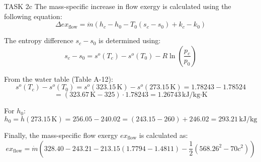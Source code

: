 TASK 2c  
The mass-specific increase in flow exergy is calculated using the following equation:  
\[
\Delta ex_{\text{flow}} = \dot{m} \left( h_c - h_0 - T_0 (s_c - s_0) + k_c - k_0 \right)
\]

The entropy difference \( s_c - s_0 \) is determined using:  
\[
s_c - s_0 = s^o(T_c) - s^o(T_0) - R \ln \left( \frac{p_c}{p_0} \right)
\]

From the water table (Table A-12):  
\[
s^o(T_c) - s^o(T_0) = s^o(323.15 \, \text{K}) - s^o(273.15 \, \text{K}) = 1.78243 - 1.78524
\]  
\[
= (323.67 \, \text{K} - 325) \cdot 1.78243 = 1.26743 \, \text{kJ/kg·K}
\]

For \( h_0 \):  
\[
h_0 = h(273.15 \, \text{K}) = 256.05 - 240.02 = (243.15 - 260) + 246.02 = 293.21 \, \text{kJ/kg}
\]

Finally, the mass-specific flow exergy \( ex_{\text{flow}} \) is calculated as:  
\[
ex_{\text{flow}} = \dot{m} \left( 328.40 - 243.21 - 213.15 (1.7794 - 1.4811) - \frac{1}{2} (568.26^2 - 70c^2) \right)
\]